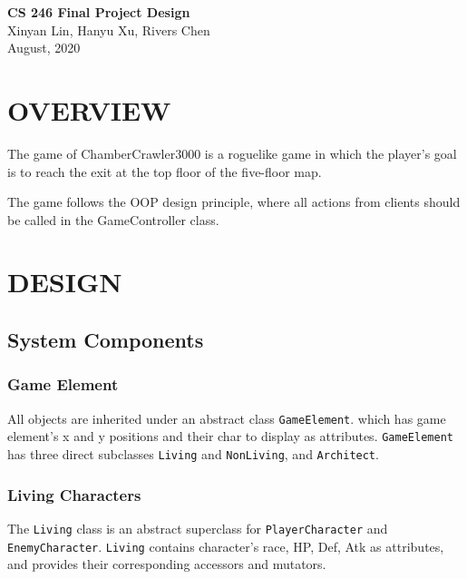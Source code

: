 \documentclass[11pt]{article}
\theoremstyle{plain} \newtheorem{theorem*}{Theorem}[subsection]
\begin{document}
\begin{center} {\LARGE \textbf{CS 246 Final Project Design}}\\ \vspace{0.15 in}
Xinyan Lin, Hanyu Xu, Rivers Chen\\ \vspace{0.07 in} August, 2020 \end{center}

\vspace{0.3 in} \section{OVERVIEW} The game of ChamberCrawler3000 is a
roguelike game in which the player’s goal is to reach the exit at the top floor
of the five-floor map.  

The game follows the OOP design principle, where all actions from clients
should be called in the GameController class.  


\section{DESIGN} \subsection{System Components}

\subsubsection{Game Element}

All objects are inherited under an abstract class \texttt{GameElement}. which
has game element's x and y positions and their char to display as attributes.
\texttt{GameElement} has three direct subclasses \texttt{Living} and
\texttt{NonLiving}, and \texttt{Architect}.


\subsubsection{Living Characters}

The \texttt{Living} class is an abstract superclass for
\texttt{PlayerCharacter} and \texttt{EnemyCharacter}.  \texttt{Living} contains
character's race, HP, Def, Atk as attributes, and provides their corresponding
accessors and mutators.
\end{document}
